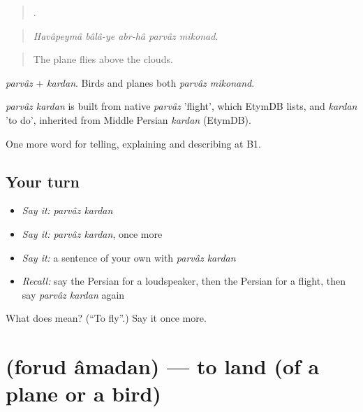 \begin{quote}
    .
\end{quote}

\begin{quote}
\emph{Havâpeymâ bâlâ-ye abr-hâ parvâz mikonad.}
\end{quote}

\begin{quote}
The plane flies above the clouds.
\end{quote}

\emph{parvâz} + \emph{kardan}. Birds and planes both \emph{parvâz mikonand}.

\begin{cousinweb}
\emph{parvâz kardan} is built from native \emph{parvâz} 'flight', which EtymDB lists, and \emph{kardan} 'to do', inherited from Middle Persian \emph{kardan} (EtymDB).
\end{cousinweb}

\begin{grammarlens}[title={What you've built}]
One more word for telling, explaining and describing at B1.
\end{grammarlens}

\subsection*{Your turn}
\begin{itemize}
\raggedright
  \item \emph{Say it:} \emph{parvâz kardan}
  \item \emph{Say it:} \emph{parvâz kardan}, once more
  \item \emph{Say it:} a sentence of your own with \emph{parvâz kardan}
  \item \emph{Recall:} say the Persian for a loudspeaker, then the Persian for a flight, then say \emph{parvâz kardan} again
\end{itemize}

\begin{tcolorbox}[breakable,colback=teal!4,colframe=teal!35!black,title={Before you move on}]
What does   mean? (\textquotedblleft{}To fly\textquotedblright{}.) Say it once more.
\end{tcolorbox}
\section[\texorpdfstring{\fa{فرود} \fa{آمدن} (forud âmadan)}{فرود آمدن (forud âmadan)}]{  (forud âmadan) — to land (of a plane or a bird)}

